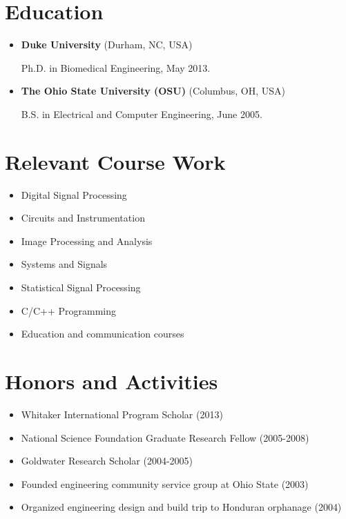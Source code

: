 \documentclass[letterpaper,10pt,english]{sphinxmanual}
\begin{document}
\section{Education}
\label{resume:education}\begin{itemize}
\item {} 
\textbf{Duke University} (Durham, NC, USA)

Ph.D. in Biomedical Engineering, May 2013.

\item {} 
\textbf{The Ohio State University (OSU)} (Columbus, OH, USA)

B.S. in Electrical and Computer Engineering, June 2005.

\end{itemize}


\section{Relevant Course Work}
\label{resume:relevant-course-work}\begin{itemize}
\item {} 
Digital Signal Processing

\item {} 
Circuits and Instrumentation

\item {} 
Image Processing and Analysis

\item {} 
Systems and Signals

\item {} 
Statistical Signal Processing

\item {} 
C/C++ Programming

\item {} 
Education and communication courses

\end{itemize}


\section{Honors and Activities}
\label{resume:honors-and-activities}\begin{itemize}
\item {} 
Whitaker International Program Scholar (2013)

\item {} 
National Science Foundation Graduate Research Fellow (2005-2008)

\item {} 
Goldwater Research Scholar (2004-2005)

\item {} 
Founded engineering community service group at Ohio State (2003)

\item {} 
Organized engineering design and build trip to Honduran orphanage
(2004)

\end{itemize}
\end{document}
